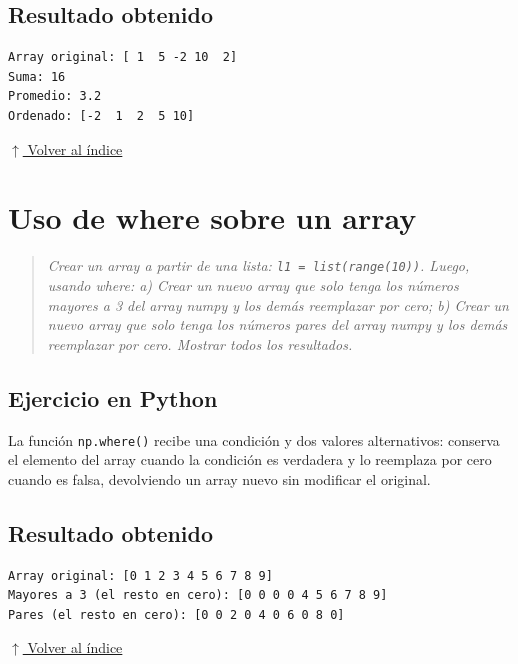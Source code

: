 \documentclass[12pt]{article}
\newcommand{\codigopython}[2]{%
}
\newcommand{\volverindice}{%
    \vspace{1em}%
    \begin{flushright}%
        \hyperlink{indice}{\small $\uparrow$ Volver al índice}%
    \end{flushright}%
}
\newcommand{\enunciado}[1]{%
    \begin{quote}
        \itshape #1
    \end{quote}
}
\begin{document}
\codigopython{11}{Suma, promedio y ordenamiento de un array}

\subsection*{Resultado obtenido}

\begin{lstlisting}[style=salida]
Array original: [ 1  5 -2 10  2]
Suma: 16
Promedio: 3.2
Ordenado: [-2  1  2  5 10]
\end{lstlisting}

\volverindice
\newpage


\section{Uso de where sobre un array}

\enunciado{Crear un array a partir de una lista: \texttt{l1 = list(range(10))}. Luego, usando where: a) Crear un nuevo array que solo tenga los números mayores a 3 del array numpy y los demás reemplazar por cero; b) Crear un nuevo array que solo tenga los números pares del array numpy y los demás reemplazar por cero. Mostrar todos los resultados.}

\subsection*{Ejercicio en Python}

La función \texttt{np.where()} recibe una condición y dos valores alternativos: conserva el elemento del array cuando la condición es verdadera y lo reemplaza por cero cuando es falsa, devolviendo un array nuevo sin modificar el original.

\codigopython{12}{Uso de where sobre un array}

\subsection*{Resultado obtenido}

\begin{lstlisting}[style=salida]
Array original: [0 1 2 3 4 5 6 7 8 9]
Mayores a 3 (el resto en cero): [0 0 0 0 4 5 6 7 8 9]
Pares (el resto en cero): [0 0 2 0 4 0 6 0 8 0]
\end{lstlisting}

\volverindice
\newpage
\end{document}
